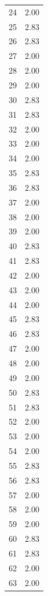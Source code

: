 \documentclass[a4paper,11pt]{article}
\begin{document}
\begin{center}
\begin{longtable}{|R{1.5cm}|R{2.5cm}|}
   24  &         2.00 \\ 
   25  &         2.83 \\ 
   26  &         2.83 \\ 
   27  &         2.00 \\ 
   28  &         2.00 \\ 
   29  &         2.00 \\ 
   30  &         2.83 \\ 
   31  &         2.83 \\ 
   32  &         2.00 \\ 
   33  &         2.00 \\ 
   34  &         2.00 \\ 
   35  &         2.83 \\ 
   36  &         2.83 \\ 
   37  &         2.00 \\ 
   38  &         2.00 \\ 
   39  &         2.00 \\ 
   40  &         2.83 \\ 
   41  &         2.83 \\ 
   42  &         2.00 \\ 
   43  &         2.00 \\ 
   44  &         2.00 \\ 
   45  &         2.83 \\ 
   46  &         2.83 \\ 
   47  &         2.00 \\ 
   48  &         2.00 \\ 
   49  &         2.00 \\ 
   50  &         2.83 \\ 
   51  &         2.83 \\ 
   52  &         2.00 \\ 
   53  &         2.00 \\ 
   54  &         2.00 \\ 
   55  &         2.83 \\ 
   56  &         2.83 \\ 
   57  &         2.00 \\ 
   58  &         2.00 \\ 
   59  &         2.00 \\ 
   60  &         2.83 \\ 
   61  &         2.83 \\ 
   62  &         2.00 \\ 
   63  &         2.00 \\ 

\end{longtable}
\end{center}
\end{document}
